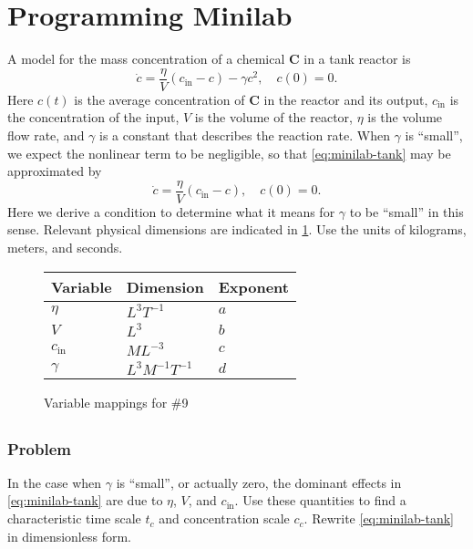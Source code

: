 \documentclass[12pt,twoside]{article}
\begin{document}
\section{Programming Minilab}
A model for the mass concentration of a chemical \textbf{C} in a tank reactor is
\begin{equation}
  \label{eq:minilab-tank}
  \dot{c} = \frac{\eta}{V}(c_{\text{in}}-c)-\gamma c^2,\quad c(0)=0.
\end{equation}
Here $c(t)$ is the average concentration of \textbf{C} in the reactor and its
output, $c_{\text{in}}$ is the concentration of the input, $V$ is the volume of
the reactor, $\eta$ is the volume flow rate, and $\gamma$ is a constant that
describes the reaction rate. When $\gamma$ is ``small'', we expect the nonlinear
term to be negligible, so that \cref{eq:minilab-tank} may be approximated by
\begin{equation}
  \label{eq:minilab-tank-approx}
  \dot{c} = \frac{\eta}{V}(c_{\text{in}}-c),\quad c(0)=0.
\end{equation}
Here we derive a condition to determine what it means for $\gamma$ to be
``small'' in this sense. Relevant physical dimensions are indicated in
\cref{fig:minilab-var-mappings}. Use the units of kilograms, meters, and
seconds.

\begin{figure}
  \centering
  \begin{tabularx}{0.5\textwidth}{XXX}
    Variable & Dimension & Exponent \\ \hline
    $\eta$ & $L^3T^{-1}$ & $a$ \\
    $V$ & $L^3$ & $b$ \\
    $c_{\text{in}}$ & $ML^{-3}$ & $c$ \\
    $\gamma$ & $L^3M^{-1}T^{-1}$ & $d$ \\
  \end{tabularx}
  \caption{Variable mappings for \#9}
  \label{fig:minilab-var-mappings}
\end{figure}

\subsection{}
\label{sec:minilab-first-problem}
\subsubsection*{Problem}
In the case when $\gamma$ is ``small'', or actually zero, the dominant effects
in \cref{eq:minilab-tank} are due to $\eta$, $V$, and $c_{\text{in}}$. Use these
quantities to find a characteristic time scale $t_c$ and concentration scale
$c_c$. Rewrite \cref{eq:minilab-tank} in dimensionless form.
\end{document}
